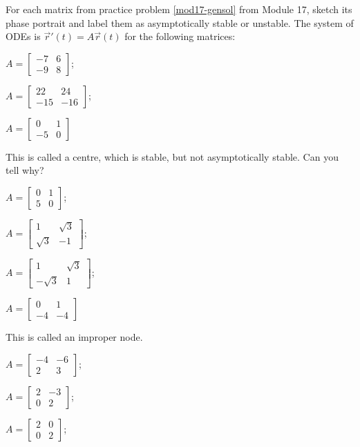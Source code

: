 \begin{exercises}

	\begin{problist}
	\prob For each matrix from practice problem \ref{mod17-gensol} from Module 17, sketch its phase portrait and label them as asymptotically stable or unstable. The system of ODEs is $\vec{r}'(t) = A \vec{r}(t)$ for the following matrices:
	\begin{enumerate}
	\begin{minipage}{.2\textwidth}
		\item $A = \begin{bmatrix} -7 & 6 \\ -9 & 8 \end{bmatrix}$;
		\item $A = \begin{bmatrix} 22 & 24 \\ -15 & -16\end{bmatrix}$;
		\item $A = \begin{bmatrix} 0 & 1 \\ -5 & 0 \end{bmatrix}$
		
		This is called a centre, which is stable, but not asymptotically stable. Can you tell why?
		\item $A = \begin{bmatrix} 0 & 1 \\ 5 & 0 \end{bmatrix}$;
		\item $A = \begin{bmatrix} 1 & \sqrt{3} \\ \sqrt{3} & -1\end{bmatrix}$;
		\item $A = \begin{bmatrix} 1 & \sqrt{3} \\ -\sqrt{3} & 1\end{bmatrix}$;
	\end{minipage}
	\qquad
	\begin{minipage}{.2\textwidth}
		\item $A = \begin{bmatrix} 0 & 1 \\ -4 & -4 \end{bmatrix}$
		
		This is called an improper node.
		\item $A = \begin{bmatrix} -4 & -6 \\ 2 & 3 \end{bmatrix}$;
		\item $A = \begin{bmatrix} 2 & -3 \\ 0 & 2 \end{bmatrix}$;
		\item $A = \begin{bmatrix} 2 & 0 \\ 0 & 2 \end{bmatrix}$;
		

\end{minipage}
\end{enumerate}
\end{problist}
\end{exercises}
